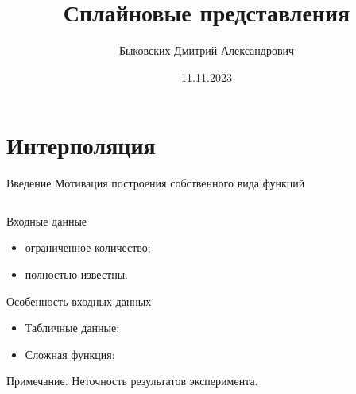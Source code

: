 \documentclass{beamer}
\title[Сплайны]{Сплайновые представления}
\author[Быковских Д.А.]{Быковских Дмитрий Александрович}
\date{11.11.2023}
\begin{document}
	\begin{frame}
		\titlepage
	\end{frame}

	\section{Интерполяция}

	\begin{frame}{Введение} {Мотивация построения собственного вида функций}
	
		\begin{columns}
			\begin{column}{0.5\textwidth}
				Входные данные
				\begin{itemize}
					\item ограниченное количество;
					\item полностью известны.
				\end{itemize}
				Особенность входных данных
				\begin{itemize}
					\item Табличные данные;
					\item Сложная функция;
				\end{itemize}
				Примечание. Неточность результатов эксперимента.
					

\end{column}
\end{columns}
\end{frame}
\end{document}
